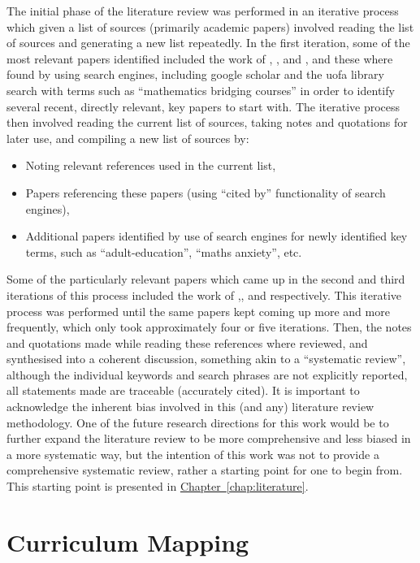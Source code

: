 \documentclass[twoside,12pt,a4paper]{report}
\newcommand{\refchap}[1]{\hyperref[chap:#1]{Chapter~\ref{chap:#1}}}
\begin{document}
The initial phase of the literature review was performed in an iterative process which given a list of sources (primarily academic papers) involved reading the list of sources and generating a new list repeatedly. In the first iteration, some of the most relevant papers identified included the work of , , and , and these where found by using search engines, including google scholar and the \gls{uofa} library search with terms such as ``mathematics bridging courses'' in order to identify several recent, directly relevant, key papers to start with. The iterative process then involved reading the current list of sources, taking notes and quotations for later use, and compiling a new list of sources by:
\begin{itemize}
	\item Noting relevant references used in the current list, 
	\item Papers referencing these papers (using ``cited by'' functionality of search engines),
	\item Additional papers identified by use of search engines for newly identified key terms, such as ``adult-education'', ``maths anxiety'', etc.
\end{itemize}
Some of the particularly relevant papers which came up in the second and third iterations of this process included the work of  ,, and  respectively. This iterative process was performed until the same papers kept coming up more and more frequently, which only took approximately four or five iterations. Then, the notes and quotations made while reading these references where reviewed, and synthesised into a coherent discussion, something akin to a ``systematic review'', although the individual keywords and search phrases are not explicitly reported, all statements made are traceable (accurately cited). It is important to acknowledge the inherent bias involved in this (and any) literature review methodology. One of the future research directions for this work would be to further expand the literature review to be more comprehensive and less biased in a more systematic way, but the intention of this work was not to provide a comprehensive systematic review, rather a starting point for one to begin from. This starting point is presented in \refchap{literature}.



\section{Curriculum Mapping}
\end{document}
